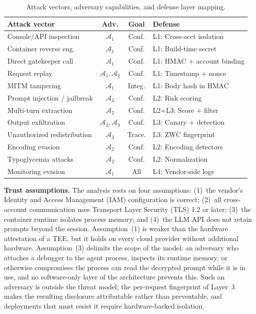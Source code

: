 \begin{table}[t]
\caption{\label{tab:threats}Attack vectors, adversary capabilities, and defense layer mapping.}
\centering
\scriptsize
\setlength{\tabcolsep}{2pt}
\begin{tabular}{@{}lccl@{}}
\toprule
\textbf{Attack vector} & \textbf{Adv.} & \textbf{Goal} & \textbf{Defense} \\
\midrule
Console/API inspection       & $\mathcal{A}_1$                  & Conf. & L1: Cross-acct isolation \\
Container reverse eng.       & $\mathcal{A}_1$                  & Conf. & L1: Build-time secret \\
Direct gatekeeper call       & $\mathcal{A}_1$                  & Conf. & L1: HMAC + account binding \\
Request replay               & $\mathcal{A}_1, \mathcal{A}_2$   & Conf. & L1: Timestamp + nonce \\
MITM tampering               & $\mathcal{A}_1$                  & Integ. & L1: Body hash in HMAC \\
Prompt injection / jailbreak & $\mathcal{A}_2$                  & Conf. & L2: Risk scoring \\
Multi-turn extraction        & $\mathcal{A}_2$                  & Conf. & L2+L3: Score + filter \\
Output exfiltration          & $\mathcal{A}_2, \mathcal{A}_3$   & Conf. & L3: Canary + detection \\
Unauthorized redistribution  & $\mathcal{A}_3$                  & Trace. & L3: ZWC fingerprint \\
Encoding evasion             & $\mathcal{A}_2$                  & Conf. & L2: Encoding detectors \\
Typoglycemia attacks         & $\mathcal{A}_2$                  & Conf. & L2: Normalization \\
Monitoring evasion           & $\mathcal{A}_1$                  & All   & L4: Vendor-side logs \\
\bottomrule
\end{tabular}
\end{table}

\textbf{Trust assumptions.} The analysis rests on four assumptions: (1)~the vendor's Identity and Access Management (IAM) configuration is correct; (2)~all cross-account communication uses Transport Layer Security (TLS) 1.2 or later; (3)~the container runtime isolates process memory; and (4)~the LLM API does not retain prompts beyond the session. Assumption~(1) is weaker than the hardware attestation of a TEE, but it holds on every cloud provider without additional hardware. Assumption~(3) delimits the scope of the model: an adversary who attaches a debugger to the agent process, inspects its runtime memory, or otherwise compromises the process can read the decrypted prompt while it is in use, and no software-only layer of the architecture prevents this. Such an adversary is outside the threat model; the per-request fingerprint of Layer~3 makes the resulting disclosure attributable rather than preventable, and deployments that must resist it require hardware-backed isolation.
